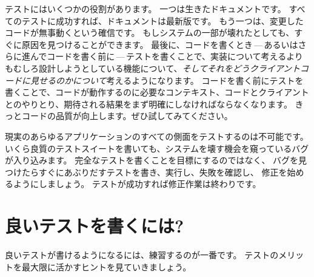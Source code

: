 \documentclass[a4paper,10pt,twoside]{book}
\begin{document}
テストにはいくつかの役割があります。
一つは生きたドキュメントです。
すべてのテストに成功すれば、ドキュメントは最新版です。
もう一つは、変更したコードが無事動くという確信です。
もしシステムの一部が壊れたとしても、すぐに原因を見つけることができます。
最後に、コードを書くとき\,---\,あるいはさらに進んでコードを書く前に\,---\,テストを書くことで、実装について考えるよりもむしろ設計しようとしている機能について、\emph{そしてそれをどうクライアントコードに見せるのかについて}考えるようになります。
コードを書く前にテストを書くことで、コードが動作するのに必要なコンテキスト、コードとクライアントとのやりとり、期待される結果をまず明確にしなければならなくなります。
きっとコードの品質が向上します。ぜひ試してみてください。


現実のあらゆるアプリケーションのすべての側面をテストするのは不可能です。
いくら良質のテストスイートを書いても、システムを壊す機会を窺っているバグが入り込みます。
完全なテストを書くことを目標にするのではなく、
バグを見つけたらすぐにあぶりだすテストを書き、実行し、失敗を確認し、
修正を始めるようにしましょう。
テストが成功すれば修正作業は終わりです。
\section{良いテストを書くには?}

良いテストが書けるようになるには、練習するのが一番です。
テストのメリットを最大限に活かすヒントを見ていきましょう。
\end{document}
